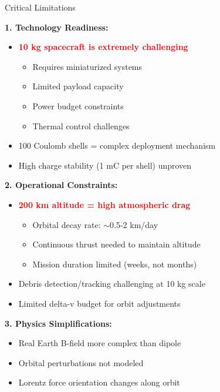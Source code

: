 \documentclass[11pt]{beamer}
\begin{document}
\begin{frame}{Critical Limitations}

\textbf{1. Technology Readiness:}
\begin{itemize}
\item \textcolor{red}{\textbf{10 kg spacecraft is extremely challenging}}
\begin{itemize}
\item Requires miniaturized systems
\item Limited payload capacity
\item Power budget constraints
\item Thermal control challenges
\end{itemize}
\item 100 Coulomb shells = complex deployment mechanism
\item High charge stability (1 mC per shell) unproven
\end{itemize}

\vspace{0.2cm}

\textbf{2. Operational Constraints:}
\begin{itemize}
\item \textcolor{red}{\textbf{200 km altitude = high atmospheric drag}}
\begin{itemize}
\item Orbital decay rate: $\sim$0.5-2 km/day
\item Continuous thrust needed to maintain altitude
\item Mission duration limited (weeks, not months)
\end{itemize}
\item Debris detection/tracking challenging at 10 kg scale
\item Limited delta-v budget for orbit adjustments
\end{itemize}

\vspace{0.2cm}

\textbf{3. Physics Simplifications:}
\begin{itemize}
\item Real Earth B-field more complex than dipole
\item Orbital perturbations not modeled
\item Lorentz force orientation changes along orbit
\end{itemize}

\end{frame}
\end{document}
